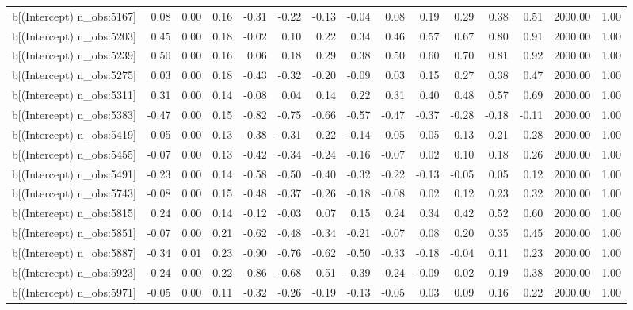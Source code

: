 \begin{table}[ht]
\begin{tabular}{rrrrrrrrrrrrrrr}
  b[(Intercept) n\_obs:5167] & 0.08 & 0.00 & 0.16 & -0.31 & -0.22 & -0.13 & -0.04 & 0.08 & 0.19 & 0.29 & 0.38 & 0.51 & 2000.00 & 1.00 \\ 
  b[(Intercept) n\_obs:5203] & 0.45 & 0.00 & 0.18 & -0.02 & 0.10 & 0.22 & 0.34 & 0.46 & 0.57 & 0.67 & 0.80 & 0.91 & 2000.00 & 1.00 \\ 
  b[(Intercept) n\_obs:5239] & 0.50 & 0.00 & 0.16 & 0.06 & 0.18 & 0.29 & 0.38 & 0.50 & 0.60 & 0.70 & 0.81 & 0.92 & 2000.00 & 1.00 \\ 
  b[(Intercept) n\_obs:5275] & 0.03 & 0.00 & 0.18 & -0.43 & -0.32 & -0.20 & -0.09 & 0.03 & 0.15 & 0.27 & 0.38 & 0.47 & 2000.00 & 1.00 \\ 
  b[(Intercept) n\_obs:5311] & 0.31 & 0.00 & 0.14 & -0.08 & 0.04 & 0.14 & 0.22 & 0.31 & 0.40 & 0.48 & 0.57 & 0.69 & 2000.00 & 1.00 \\ 
  b[(Intercept) n\_obs:5383] & -0.47 & 0.00 & 0.15 & -0.82 & -0.75 & -0.66 & -0.57 & -0.47 & -0.37 & -0.28 & -0.18 & -0.11 & 2000.00 & 1.00 \\ 
  b[(Intercept) n\_obs:5419] & -0.05 & 0.00 & 0.13 & -0.38 & -0.31 & -0.22 & -0.14 & -0.05 & 0.05 & 0.13 & 0.21 & 0.28 & 2000.00 & 1.00 \\ 
  b[(Intercept) n\_obs:5455] & -0.07 & 0.00 & 0.13 & -0.42 & -0.34 & -0.24 & -0.16 & -0.07 & 0.02 & 0.10 & 0.18 & 0.26 & 2000.00 & 1.00 \\ 
  b[(Intercept) n\_obs:5491] & -0.23 & 0.00 & 0.14 & -0.58 & -0.50 & -0.40 & -0.32 & -0.22 & -0.13 & -0.05 & 0.05 & 0.12 & 2000.00 & 1.00 \\ 
  b[(Intercept) n\_obs:5743] & -0.08 & 0.00 & 0.15 & -0.48 & -0.37 & -0.26 & -0.18 & -0.08 & 0.02 & 0.12 & 0.23 & 0.32 & 2000.00 & 1.00 \\ 
  b[(Intercept) n\_obs:5815] & 0.24 & 0.00 & 0.14 & -0.12 & -0.03 & 0.07 & 0.15 & 0.24 & 0.34 & 0.42 & 0.52 & 0.60 & 2000.00 & 1.00 \\ 
  b[(Intercept) n\_obs:5851] & -0.07 & 0.00 & 0.21 & -0.62 & -0.48 & -0.34 & -0.21 & -0.07 & 0.08 & 0.20 & 0.35 & 0.45 & 2000.00 & 1.00 \\ 
  b[(Intercept) n\_obs:5887] & -0.34 & 0.01 & 0.23 & -0.90 & -0.76 & -0.62 & -0.50 & -0.33 & -0.18 & -0.04 & 0.11 & 0.23 & 2000.00 & 1.00 \\ 
  b[(Intercept) n\_obs:5923] & -0.24 & 0.00 & 0.22 & -0.86 & -0.68 & -0.51 & -0.39 & -0.24 & -0.09 & 0.02 & 0.19 & 0.38 & 2000.00 & 1.00 \\ 
  b[(Intercept) n\_obs:5971] & -0.05 & 0.00 & 0.11 & -0.32 & -0.26 & -0.19 & -0.13 & -0.05 & 0.03 & 0.09 & 0.16 & 0.22 & 2000.00 & 1.00 \\ 

\end{tabular}
\end{table}
